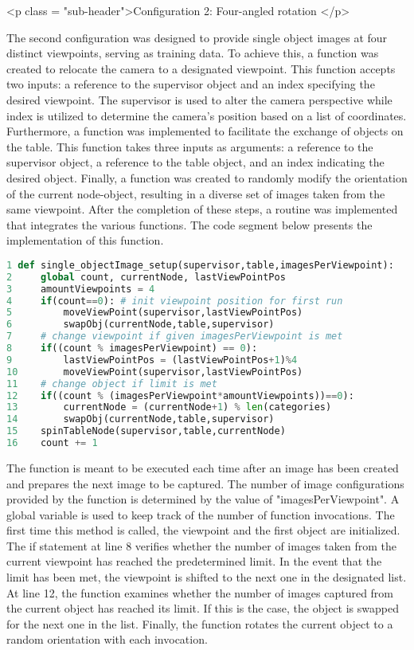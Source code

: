 <p class = "sub-header">Configuration 2: Four-angled rotation </p>

The second configuration was designed to provide single object images at four distinct viewpoints, serving as training data. To achieve this, a function was created to relocate the camera to a designated viewpoint. This function accepts two inputs: a reference to the supervisor object and an index specifying the desired viewpoint. The supervisor is used to alter the camera perspective while index is utilized to determine the camera's position based on a list of coordinates. Furthermore, a function was implemented to facilitate the exchange of objects on the table. This function takes three inputs as arguments: a reference to the supervisor object, a reference to the table object, and an index indicating the desired object. Finally, a function was created to randomly modify the orientation of the current node-object, resulting in a diverse set of images taken from the same viewpoint. After the completion of these steps, a routine was implemented that integrates the various functions. The code segment below presents the implementation of this function. 

\begin{lstlisting}[language=python]
1 def single_objectImage_setup(supervisor,table,imagesPerViewpoint):
2     global count, currentNode, lastViewPointPos
3     amountViewpoints = 4
4     if(count==0): # init viewpoint position for first run
5         moveViewPoint(supervisor,lastViewPointPos)
6         swapObj(currentNode,table,supervisor)
7     # change viewpoint if given imagesPerViewpoint is met
8     if((count % imagesPerViewpoint) == 0):
9         lastViewPointPos = (lastViewPointPos+1)%4
10        moveViewPoint(supervisor,lastViewPointPos)
11    # change object if limit is met
12    if((count % (imagesPerViewpoint*amountViewpoints))==0):
13        currentNode = (currentNode+1) % len(categories)
14        swapObj(currentNode,table,supervisor)
15    spinTableNode(supervisor,table,currentNode)
16    count += 1
\end{lstlisting}
The function is meant to be executed each time after an image has been created and prepares the next image to be captured. The number of image configurations provided by the function is determined by the value of "imagesPerViewpoint". A global variable is used to keep track of the number of function invocations. The first time this method is called, the viewpoint and the first object are initialized. The if statement at line 8 verifies whether the number of images taken from the current viewpoint has reached the predetermined limit. In the event that the limit has been met, the viewpoint is shifted to the next one in the designated list. At line 12, the function examines whether the number of images captured from the current object has reached its limit. If this is the case, the object is swapped for the next one in the list. Finally, the function rotates the current object to a random orientation with each invocation. 

